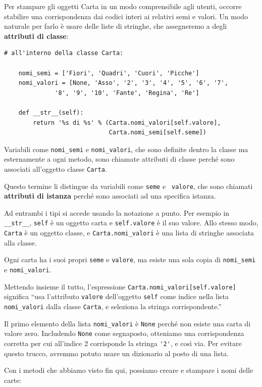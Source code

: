 \documentclass[10pt]{book}
\begin{document}
Per stampare gli oggetti Carta in un modo comprensibile agli utenti, occorre stabilire una corrispondenza dai codici interi ai relativi semi e valori. Un modo naturale per farlo è usare delle liste di stringhe, che assegneremo a degli {\bf attributi di classe}:

\begin{verbatim}
# all'interno della classe Carta:

    nomi_semi = ['Fiori', 'Quadri', 'Cuori', 'Picche']
    nomi_valori = [None, 'Asso', '2', '3', '4', '5', '6', '7', 
              '8', '9', '10', 'Fante', 'Regina', 'Re']

    def __str__(self):
        return '%s di %s' % (Carta.nomi_valori[self.valore],
                             Carta.nomi_semi[self.seme])
\end{verbatim}
%
Variabili come \verb"nomi_semi" e \verb"nomi_valori", che sono definite dentro la classe ma esternamente a ogni metodo, sono chiamate attributi di classe perché sono associati all'oggetto classe {\tt Carta}.

Questo termine li distingue da variabili come {\tt seme} e {\tt
  valore}, che sono chiamati {\bf attributi di istanza} perché sono associati ad una specifica istanza.

Ad entrambi i tipi si accede usando la notazione a punto. Per esempio in \verb"__str__", {\tt self} è un oggetto carta e {\tt self.valore} è il suo valore.  Allo stesso modo, {\tt Carta} è un oggetto classe, e \verb"Carta.nomi_valori" è una lista di stringhe associata alla classe.

Ogni carta ha i suoi propri {\tt seme} e {\tt valore}, ma esiste una sola copia di \verb"nomi_semi" e \verb"nomi_valori".

Mettendo insieme il tutto, l'espressione
\verb"Carta.nomi_valori[self.valore]" significa ``usa l'attributo {\tt valore} dell'oggetto {\tt self} come indice nella lista \verb"nomi_valori"
dalla classe {\tt Carta}, e seleziona la stringa corrispondente.''

Il primo elemento della lista \verb"nomi_valori" è {\tt None} perché non esiste una carta di valore zero. Includendo {\tt None} come segnaposto, otteniamo una corrispondenza corretta per cui all'indice 2 corrisponde la stringa \verb"'2'", e così via. Per evitare questo trucco, avremmo potuto usare un dizionario al posto di una lista.

Con i metodi che abbiamo visto fin qui, possiamo creare e stampare i nomi delle carte:
\end{document}
